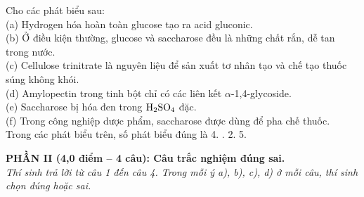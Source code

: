 \documentclass[12pt,a4paper]{article}
\begin{document}
\begin{ex}
Cho các phát biểu sau:\\
(a) Hydrogen hóa hoàn toàn glucose tạo ra acid gluconic.\\
(b) Ở điều kiện thường, glucose và saccharose đều là những chất rắn, dễ tan trong nước.\\
(c) Cellulose trinitrate là nguyên liệu để sản xuất tơ nhân tạo và chế tạo thuốc súng không khói.\\
(d) Amylopectin trong tinh bột chỉ có các liên kết $\alpha$-1,4-glycoside.\\
(e) Saccharose bị hóa đen trong $\ce{H2SO4}$ đặc.\\
(f) Trong công nghiệp dược phẩm, saccharose được dùng để pha chế thuốc.\\
Trong các phát biểu trên, số phát biểu đúng là
\choice
{4.}
{.}
{2.}
{5.}
\end{ex}


\vspace{0.15cm}
\noindent
\textbf{PHẦN II (4,0 điểm -- 4 câu): Câu trắc nghiệm đúng sai.}\\
\textit{Thí sinh trả lời từ câu 1 đến câu 4. Trong mỗi ý a), b), c), d) ở mỗi câu, thí sinh chọn đúng hoặc sai.}

\setcounter{ex}{0}
\end{document}
